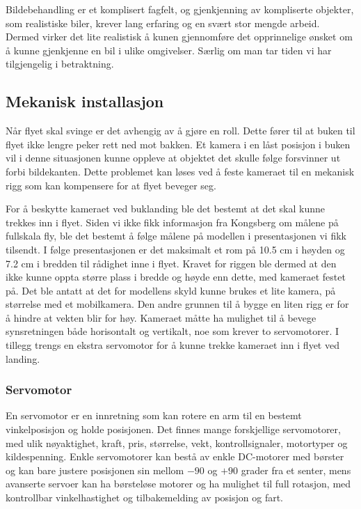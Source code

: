 Bildebehandling er et komplisert fagfelt, og gjenkjenning av kompliserte objekter, som realistiske biler, krever lang erfaring og en svært stor mengde arbeid. Dermed virker det lite realistisk å kunen gjennomføre det opprinnelige ønsket om å kunne gjenkjenne en bil i ulike omgivelser. Særlig om man tar tiden vi har tilgjengelig i betraktning.

\subsection{Mekanisk installasjon}
Når flyet skal svinge er det avhengig av å gjøre en roll. Dette fører til at buken til flyet ikke lengre peker rett ned mot bakken. Et kamera i en låst posisjon i buken vil i denne situasjonen kunne oppleve at objektet det skulle følge forsvinner ut forbi bildekanten. Dette problemet kan løses ved å feste kameraet til en mekanisk rigg som kan kompensere for at flyet beveger seg.

For å beskytte kameraet ved buklanding ble det bestemt at det skal kunne trekkes inn i flyet. Siden vi ikke fikk informasjon fra Kongsberg om målene på fullskala fly, ble det bestemt å følge målene på modellen i presentasjonen vi fikk tilsendt. I følge presentasjonen er det maksimalt et rom på 10.5 cm i høyden og 7.2 cm i bredden til rådighet inne i flyet. Kravet for riggen ble dermed at den ikke kunne oppta større plass i bredde og høyde enn dette, med kameraet festet på. Det ble antatt at det for modellens skyld kunne brukes et lite kamera, på størrelse med et mobilkamera. Den andre grunnen til å bygge en liten rigg er for å hindre at vekten blir for høy. Kameraet måtte ha mulighet til å bevege synsretningen både horisontalt og vertikalt, noe som krever to servomotorer. I tillegg trengs en ekstra servomotor for å kunne trekke kameraet inn i flyet ved landing.

\subsubsection{Servomotor}

En servomotor er en innretning som kan rotere en arm til en bestemt vinkelposisjon og holde posisjonen. Det finnes mange forskjellige servomotorer, med ulik nøyaktighet, kraft, pris, størrelse, vekt, kontrollsignaler, motortyper og kildespenning. Enkle servomotorer kan bestå av enkle DC-motorer med børster og kan bare justere posisjonen sin mellom $-90$ og $+90$ grader fra et senter, mens avanserte servoer kan ha børsteløse motorer og ha mulighet til full rotasjon, med kontrollbar vinkelhastighet og tilbakemelding av posisjon og fart.

